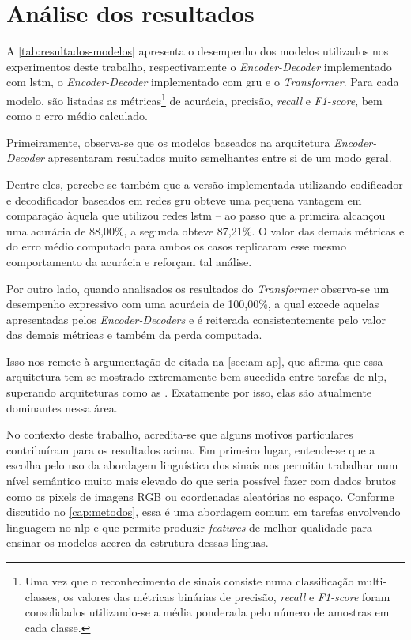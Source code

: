 \section{Análise dos resultados}
\label{sec:avaliacao-resultados}

A \autoref{tab:resultados-modelos} apresenta o desempenho dos modelos utilizados nos experimentos deste trabalho, respectivamente o \textit{Encoder-Decoder} implementado com \acrshort{lstm}, o \textit{Encoder-Decoder} implementado com \acrshort{gru} e o \textit{Transformer}.
Para cada modelo, são listadas as métricas\footnote{
    Uma vez que o reconhecimento de sinais consiste numa classificação multi-classes, os valores das métricas binárias de precisão, \textit{recall} e \textit{F1-score} foram consolidados utilizando-se a média ponderada pelo número de amostras em cada classe.
} de acurácia, precisão, \textit{recall} e \textit{F1-score}, bem como o erro médio calculado.



Primeiramente, observa-se que os modelos baseados na arquitetura \textit{Encoder-Decoder} apresentaram resultados muito semelhantes entre si de um modo geral.

Dentre eles, percebe-se também que a versão implementada utilizando codificador e decodificador baseados em redes \acrshort{gru} obteve uma pequena vantagem em comparação àquela que utilizou redes \acrshort{lstm} -- ao passo que a primeira alcançou uma acurácia de 88,00\%, a segunda obteve 87,21\%.
O valor das demais métricas e do erro médio computado para ambos os casos replicaram esse mesmo comportamento da acurácia e reforçam tal análise.

Por outro lado, quando analisados os resultados do \textit{Transformer} observa-se um desempenho expressivo com uma acurácia de 100,00\%, a qual excede aquelas apresentadas pelos \textit{Encoder-Decoders} e é reiterada consistentemente pelo valor das demais métricas e também da perda computada.

Isso nos remete à argumentação de  citada na \autoref{sec:am-ap}, que afirma que essa arquitetura tem se mostrado extremamente bem-sucedida entre tarefas de \acrfull{nlp}, superando arquiteturas como as . Exatamente por isso, elas são atualmente dominantes nessa área.

No contexto deste trabalho, acredita-se que alguns motivos particulares contribuíram para os resultados acima.
Em primeiro lugar, entende-se que a escolha pelo uso da abordagem linguística dos sinais nos permitiu trabalhar num nível semântico muito mais elevado do que seria possível fazer com dados brutos como os pixels de imagens RGB ou coordenadas aleatórias no espaço. Conforme discutido no \autoref{cap:metodos}, essa é uma abordagem comum em tarefas envolvendo linguagem no \acrshort{nlp} e que permite produzir \textit{features} de melhor qualidade para ensinar os modelos acerca da estrutura dessas línguas.

